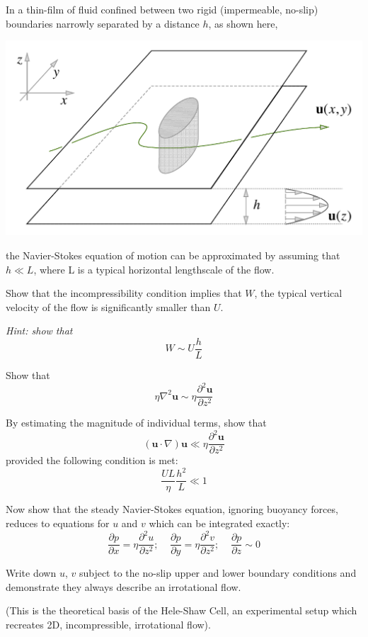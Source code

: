 \documentclass[10pt]{report}
\begin{document}
\begin{question}


In a thin-film of fluid confined between two rigid (impermeable, no-slip)
boundaries narrowly separated by a distance $h$, as shown here,

\begin{center}
	\includegraphics[width=0.6\linewidth]{Hele-Shaw-Cell.pdf}
\end{center}

the Navier-Stokes equation of motion can be approximated by assuming that $ h \ll L$,
where L is a typical horizontal lengthscale of the flow.

Show that the incompressibility condition implies that $W$, the typical
vertical velocity of the flow is significantly smaller than $U$.

\textit{Hint: show that}
\begin{equation*}
	W \sim U \frac{h}{L}
\end{equation*}

Show that
\begin{equation*}
	\eta \nabla^2 \mathbf{u} \sim \eta \frac{\partial^2 \mathbf{u}}{\partial z^2}
\end{equation*}

By estimating the magnitude of individual terms, show that
\begin{equation*}
	(\mathbf{u}\cdot\nabla) \mathbf{u} \ll \eta \frac{\partial^2 \mathbf{u}}{\partial z^2}
\end{equation*}
provided the following condition is met:
\begin{equation*}
	\frac{UL}{\eta}\frac{h^2}{L} \ll 1
\end{equation*}

Now show that the steady Navier-Stokes equation, ignoring
buoyancy forces, reduces to equations
for $u$ and $v$ which can be integrated exactly:
\begin{equation*}
	\frac{\partial p}{\partial x} = \eta \frac{\partial^2 u}{\partial z^2}; \;\;\;\;
	\frac{\partial p}{\partial y} = \eta \frac{\partial^2 v}{\partial z^2}; \;\;\;\;
	\frac{\partial p}{\partial z} \sim 0
\end{equation*}

Write down $u$, $v$ subject to the no-slip upper and lower boundary conditions and
demonstrate they always describe an irrotational flow.

(This is the theoretical basis of the Hele-Shaw Cell, an experimental setup which
recreates 2D, incompressible, irrotational flow).


\end{question}
\end{document}
